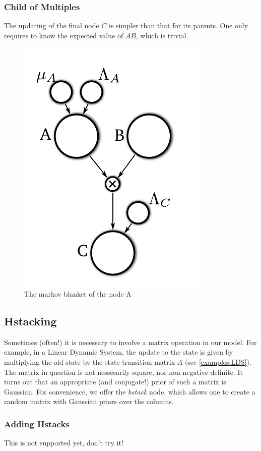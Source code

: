 \documentclass{article}
\newcommand{\<}{\langle}
\renewcommand{\>}{\rangle}
\begin{document}
\subsubsection{Child of Multiples}
The updating of the final node $C$ is simpler than that for its parents. One only requires to know the expected value of $AB$, which is trivial.


\begin{figure}
\includegraphics{images/mult_markov}
\caption{The markov blanket of the node A}
\label{fig:mult_markov}
\end{figure}

\subsection{Hstacking}
\label{hstack}
Sometimes (often!) it is necessary to involve a matrix operation in our model.  For example, in a Linear Dynamic System, the update to the state is given by multiplying the old state by the state transition matrix $A$ (see \ref{examples:LDS}).  The matrix in question is not nessesarily square, nor non-negative definite. It turns out that an appropriate (and conjugate!) prior of such a matrix is Gaussian. For convenience, we offer the {\em hstack} node, which allows one to create a random matrix with Gaussian priors over the columns.  

\subsubsection{Adding Hstacks}
This is not supported yet, don't try it!
\end{document}
